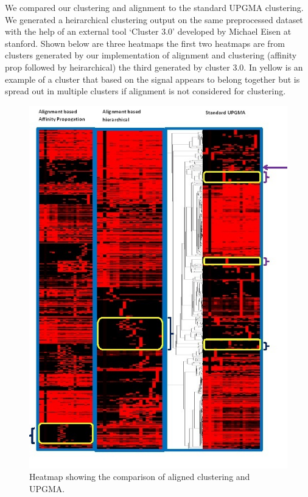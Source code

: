 \documentclass[aps,prd,final,onecolumn,a4paper,10pt]{revtex4}
\begin{document}
We compared our clustering and alignment to the standard UPGMA clustering. We generated a heirarchical clustering output on the same preprocessed dataset with the help of an external tool ‘Cluster 3.0’ developed by Michael Eisen at stanford.
Shown below are three heatmaps the first two heatmaps are from clusters generated by our implementation of alignment and clustering (affinity prop followed by heirarchical) the third generated by cluster 3.0. In yellow is an example of a cluster that based on the signal appears to belong together but is spread out in multiple clusters if alignment is not considered for clustering.

\begin{figure}[H]
\centering
\includegraphics[scale=0.75]{ClustercomparisonResults_v2.png}
\caption{Heatmap showing the comparison of aligned clustering and UPGMA.}
\label{fig:ClusterComparison}
\end{figure}
\end{document}
